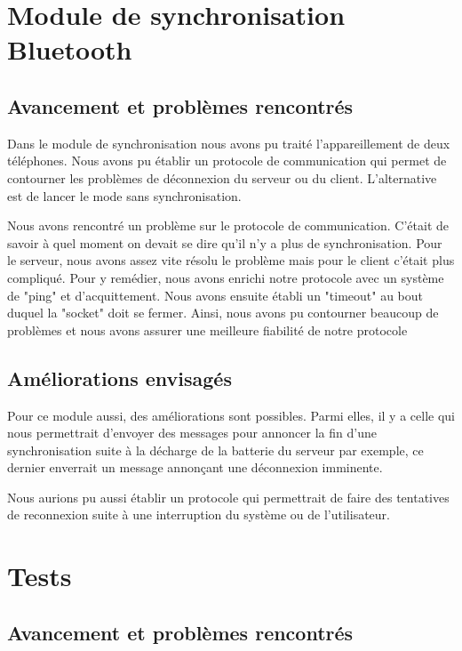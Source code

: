 \newpage
\section{Module de synchronisation Bluetooth}

\subsection{Avancement et problèmes rencontrés}
Dans le module de synchronisation nous avons pu traité l'appareillement de deux téléphones. Nous avons pu établir un protocole de communication qui permet de contourner les problèmes de déconnexion du serveur ou du client. L'alternative est de lancer le mode sans synchronisation.

Nous avons rencontré un problème sur le protocole de communication. C'était de savoir à quel moment on devait se dire qu'il n'y a plus de synchronisation. Pour le serveur, nous avons assez vite résolu le problème mais pour le client c'était plus compliqué. Pour y remédier, nous avons enrichi notre protocole avec un système de "ping" et d'acquittement. Nous avons ensuite établi un "timeout" au bout duquel la "socket" doit se fermer. Ainsi, nous avons pu contourner beaucoup de problèmes et nous avons assurer une meilleure fiabilité de notre protocole

\subsection{Améliorations envisagés}
Pour ce module aussi, des améliorations sont possibles. Parmi elles, il y a celle qui nous permettrait d'envoyer des messages pour annoncer la fin d'une synchronisation suite à la décharge de la batterie du serveur par exemple, ce dernier enverrait un message annonçant une déconnexion imminente.

Nous aurions pu aussi établir un protocole qui permettrait de faire des tentatives de reconnexion suite à une interruption du système ou de l'utilisateur.

\newpage
\section{Tests}

\subsection{Avancement et problèmes rencontrés}

